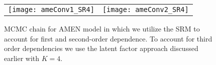 \begin{figure}[ht]
	\centering
	\begin{tabular}{cc}
	\texttt{[image: ameConv1\_SR4]} &
	\texttt{[image: ameConv2\_SR4]}
	\end{tabular}
	\caption{MCMC chain for AMEN model in which we utilize the SRM to account for first and second-order dependence. To account for third order dependencies we use the latent factor approach discussed earlier with $K=4$.}
	\label{fig:ameConv}
\end{figure}
